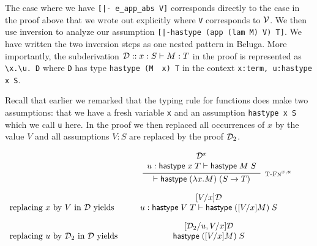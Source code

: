The case where
we have  \lstinline![|- e_app_abs V]!
corresponds directly to the case in the proof above that we
wrote out explicitly where \lstinline!V! corresponds to ${\mathcal{V}}$. We then
use inversion to analyze our assumption
\lstinline![|-hastype (app (lam M) V) T]!. We have written the two
inversion steps as one nested pattern in Beluga. More importantly, the
subderivation $\mathbin{{\mathcal{D}} :: x:S \vdash M:T }$ in the proof is represented as
\lstinline!\x.\u. D! where  
\lstinline!D! has type \lstinline!hastype (M  x) T! in the context \lstinline!x:term, u:hastype x S!.

Recall that earlier we remarked that the
typing rule for functions does make two assumptions: that we have a
fresh variable \lstinline!x! and an assumption \lstinline!hastype x S!
which we call \lstinline!u! here. In the proof we then replaced all
occurrences of $x$ by the value $V$ and all assumptions $V:S$ are
replaced by the proof ${\mathcal{D}}_2$. 

\begin{small}
  
\[
\begin{array}{l@{\quad}c@{\quad}l@{\quad}c}
& \qquad\infer[\TFn^{x,u}]
       {\vdash \tmhastype {(\lam x. M)}{(S \arrow T)}}
       {\above{\D^x}{u:\tmhastype x T \vdash \tmhastype M S}} & & \\[1em]
\mbox{replacing $x$ by $V$ in $\D$ yields} &
       {\above{[V/x]\D}{u:\tmhastype V T \vdash \tmhastype {([V/x]M)} S}} & \\[1em]
\mbox{replacing $u$ by $\D_2$ in $\D$ yields} & 
\above{[\D_2/u, V/x]\D}{\tmhastype {([V/x]M)} S}
\end{array}
\]

\end{small}


